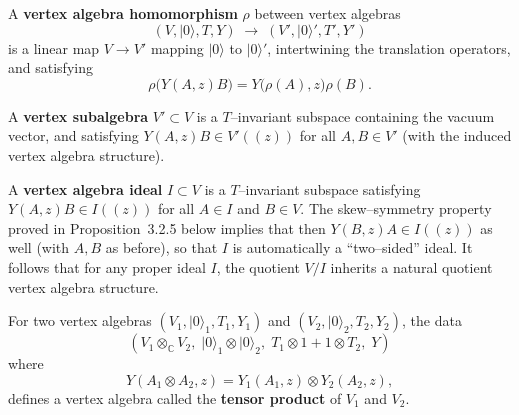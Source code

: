\documentclass[12pt]{article}
\begin{document}
\begin{definition}
    A \textbf{vertex algebra homomorphism} $\rho$ between vertex algebras
    \[
        (V, \lvert 0 \rangle, T, Y) \;\longrightarrow\; (V', \lvert 0 \rangle', T', Y')
    \]
    is a linear map $V \to V'$ mapping $\lvert 0 \rangle$ to $\lvert 0 \rangle'$,
    intertwining the translation operators, and satisfying
    \[
        \rho\big(Y(A,z)B\big) = Y\big(\rho(A),z\big)\rho(B).
    \]

    A \textbf{vertex subalgebra} $V' \subset V$ is a $T$–invariant subspace
    containing the vacuum vector, and satisfying
    $Y(A,z)B \in V'((z))$ for all $A,B \in V'$
    (with the induced vertex algebra structure).

    A \textbf{vertex algebra ideal} $I \subset V$ is a $T$–invariant subspace satisfying
    $Y(A,z)B \in I((z))$ for all $A \in I$ and $B \in V$.
    The skew–symmetry property proved in Proposition~3.2.5 below implies that then
    $Y(B,z)A \in I((z))$ as well (with $A,B$ as before), so that $I$ is automatically
    a ``two–sided'' ideal.
    It follows that for any proper ideal $I$, the quotient $V/I$ inherits
    a natural quotient vertex algebra structure.
\end{definition}
\begin{definition}
    For two vertex algebras $(V_1, \lvert 0 \rangle_1, T_1, Y_1)$
    and $(V_2, \lvert 0 \rangle_2, T_2, Y_2)$,
    the data
    \[
        (V_1 \otimes_{\mathbb{C}} V_2,\;
        \lvert 0 \rangle_1 \otimes \lvert 0 \rangle_2,\;
        T_1 \otimes 1 + 1 \otimes T_2,\;
        Y)
    \]
    where
    \[
        Y(A_1 \otimes A_2, z)
        = Y_1(A_1,z) \otimes Y_2(A_2,z),
    \]
    defines a vertex algebra called the \textbf{tensor product}
    of $V_1$ and $V_2$.
\end{definition}
\end{document}
